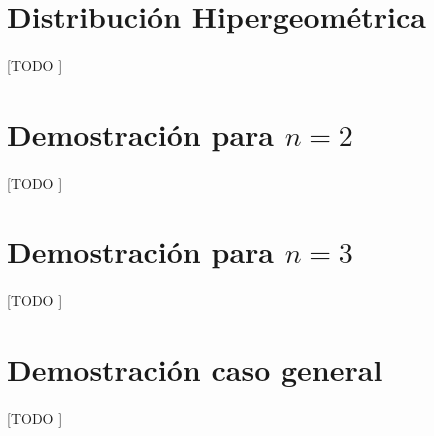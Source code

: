 \documentclass{article}
\begin{document}
	\maketitle
  \thispagestyle{empty}


  \section{Distribución Hipergeométrica}
  \label{sec:description}

    \paragraph{}
    [TODO ]

  \section{Demostración para $n=2$}
  \label{sec:demostration_1}

    \paragraph{}
    [TODO ]

  \section{Demostración para $n=3$}
  \label{sec:demostration_1}

    \paragraph{}
    [TODO ]

  \section{Demostración caso general}
  \label{sec:demostration_1}

    \paragraph{}
    [TODO ]

	\nocite{muest2017}

  
  
\end{document}
